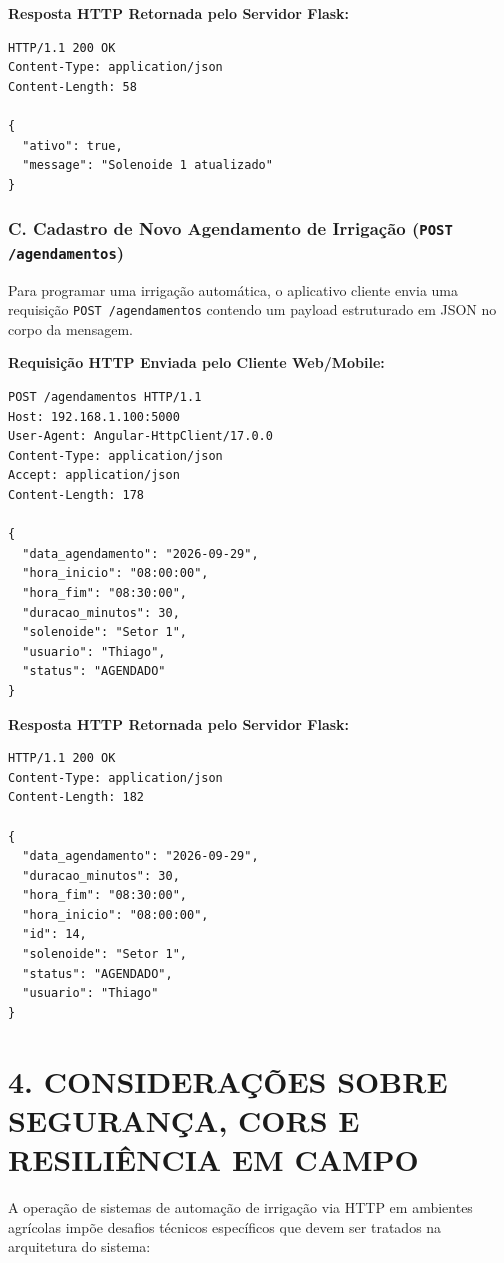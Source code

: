 \textbf{Resposta HTTP Retornada pelo Servidor Flask:}
\begin{lstlisting}
HTTP/1.1 200 OK
Content-Type: application/json
Content-Length: 58

{
  "ativo": true,
  "message": "Solenoide 1 atualizado"
}
\end{lstlisting}

\newpage

\subsubsection*{C. Cadastro de Novo Agendamento de Irrigação (\texttt{POST /agendamentos})}

Para programar uma irrigação automática, o aplicativo cliente envia uma requisição \texttt{POST /agendamentos} contendo um payload estruturado em JSON no corpo da mensagem.

\textbf{Requisição HTTP Enviada pelo Cliente Web/Mobile:}
\begin{lstlisting}
POST /agendamentos HTTP/1.1
Host: 192.168.1.100:5000
User-Agent: Angular-HttpClient/17.0.0
Content-Type: application/json
Accept: application/json
Content-Length: 178

{
  "data_agendamento": "2026-09-29",
  "hora_inicio": "08:00:00",
  "hora_fim": "08:30:00",
  "duracao_minutos": 30,
  "solenoide": "Setor 1",
  "usuario": "Thiago",
  "status": "AGENDADO"
}
\end{lstlisting}

\textbf{Resposta HTTP Retornada pelo Servidor Flask:}
\begin{lstlisting}
HTTP/1.1 200 OK
Content-Type: application/json
Content-Length: 182

{
  "data_agendamento": "2026-09-29",
  "duracao_minutos": 30,
  "hora_fim": "08:30:00",
  "hora_inicio": "08:00:00",
  "id": 14,
  "solenoide": "Setor 1",
  "status": "AGENDADO",
  "usuario": "Thiago"
}
\end{lstlisting}

\newpage

\section*{4. CONSIDERAÇÕES SOBRE SEGURANÇA, CORS E RESILIÊNCIA EM CAMPO}

A operação de sistemas de automação de irrigação via HTTP em ambientes agrícolas impõe desafios técnicos específicos que devem ser tratados na arquitetura do sistema:


